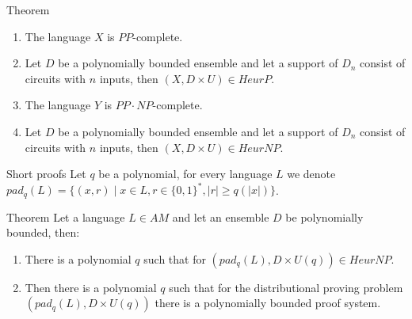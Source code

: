 \begin{frame}{}
\begin{columns}[t]
\begin{column}{0.32\linewidth}
        \begin{alertblock}{Theorem}
        	\begin{enumerate}
				\item The language $X$ is $PP$-complete.
		    	\item Let $D$ be a polynomially bounded ensemble and let a
				    support of $D_n$ consist of circuits with $n$ inputs, then 
		            $(X, D \times U) \in HeurP$.
                \item The language $Y$ is $PP \cdot NP$-complete.
		    	\item Let $D$ be a polynomially bounded ensemble and let a
				    support of $D_n$ consist of circuits with $n$ inputs, then
		            $(X, D \times U) \in HeurNP$.
		    \end{enumerate}
        \end{alertblock}

        \begin{block}{Short proofs}
            Let $q$ be a polynomial, for every language $L$ we denote $pad_q(L) = 
			\{(x, r) \mid x \in L, r \in \{0, 1\}^* , |r| \ge q(|x|)\}$.
        \end{block}

        \begin{alertblock}{Theorem}
            Let a language $L \in AM$ and let an ensemble $D$ be polynomially 
		    bounded, then:
		    \begin{enumerate}
    			\item There is a polynomial $q$ such that for $(pad_q(L),
				    D \times U(q)) \in HeurNP$.
        		\item Then there is a polynomial $q$ such that for the distributional
		            proving problem $(pad_q(L), D \times U(q))$ 
        		    there is a polynomially bounded proof system.
		    \end{enumerate}
        \end{alertblock}


        \begin{block}{}
            
        	    
        \end{block}
    \end{column}%

\end{columns}

\end{frame}

